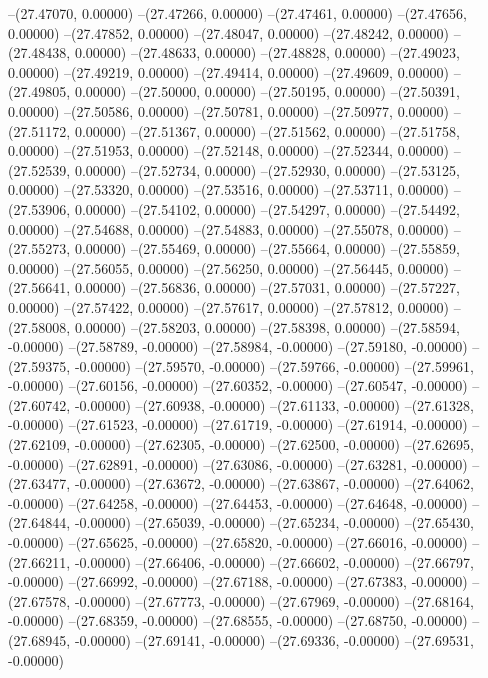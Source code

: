 --(27.47070, 0.00000)
--(27.47266, 0.00000)
--(27.47461, 0.00000)
--(27.47656, 0.00000)
--(27.47852, 0.00000)
--(27.48047, 0.00000)
--(27.48242, 0.00000)
--(27.48438, 0.00000)
--(27.48633, 0.00000)
--(27.48828, 0.00000)
--(27.49023, 0.00000)
--(27.49219, 0.00000)
--(27.49414, 0.00000)
--(27.49609, 0.00000)
--(27.49805, 0.00000)
--(27.50000, 0.00000)
--(27.50195, 0.00000)
--(27.50391, 0.00000)
--(27.50586, 0.00000)
--(27.50781, 0.00000)
--(27.50977, 0.00000)
--(27.51172, 0.00000)
--(27.51367, 0.00000)
--(27.51562, 0.00000)
--(27.51758, 0.00000)
--(27.51953, 0.00000)
--(27.52148, 0.00000)
--(27.52344, 0.00000)
--(27.52539, 0.00000)
--(27.52734, 0.00000)
--(27.52930, 0.00000)
--(27.53125, 0.00000)
--(27.53320, 0.00000)
--(27.53516, 0.00000)
--(27.53711, 0.00000)
--(27.53906, 0.00000)
--(27.54102, 0.00000)
--(27.54297, 0.00000)
--(27.54492, 0.00000)
--(27.54688, 0.00000)
--(27.54883, 0.00000)
--(27.55078, 0.00000)
--(27.55273, 0.00000)
--(27.55469, 0.00000)
--(27.55664, 0.00000)
--(27.55859, 0.00000)
--(27.56055, 0.00000)
--(27.56250, 0.00000)
--(27.56445, 0.00000)
--(27.56641, 0.00000)
--(27.56836, 0.00000)
--(27.57031, 0.00000)
--(27.57227, 0.00000)
--(27.57422, 0.00000)
--(27.57617, 0.00000)
--(27.57812, 0.00000)
--(27.58008, 0.00000)
--(27.58203, 0.00000)
--(27.58398, 0.00000)
--(27.58594, -0.00000)
--(27.58789, -0.00000)
--(27.58984, -0.00000)
--(27.59180, -0.00000)
--(27.59375, -0.00000)
--(27.59570, -0.00000)
--(27.59766, -0.00000)
--(27.59961, -0.00000)
--(27.60156, -0.00000)
--(27.60352, -0.00000)
--(27.60547, -0.00000)
--(27.60742, -0.00000)
--(27.60938, -0.00000)
--(27.61133, -0.00000)
--(27.61328, -0.00000)
--(27.61523, -0.00000)
--(27.61719, -0.00000)
--(27.61914, -0.00000)
--(27.62109, -0.00000)
--(27.62305, -0.00000)
--(27.62500, -0.00000)
--(27.62695, -0.00000)
--(27.62891, -0.00000)
--(27.63086, -0.00000)
--(27.63281, -0.00000)
--(27.63477, -0.00000)
--(27.63672, -0.00000)
--(27.63867, -0.00000)
--(27.64062, -0.00000)
--(27.64258, -0.00000)
--(27.64453, -0.00000)
--(27.64648, -0.00000)
--(27.64844, -0.00000)
--(27.65039, -0.00000)
--(27.65234, -0.00000)
--(27.65430, -0.00000)
--(27.65625, -0.00000)
--(27.65820, -0.00000)
--(27.66016, -0.00000)
--(27.66211, -0.00000)
--(27.66406, -0.00000)
--(27.66602, -0.00000)
--(27.66797, -0.00000)
--(27.66992, -0.00000)
--(27.67188, -0.00000)
--(27.67383, -0.00000)
--(27.67578, -0.00000)
--(27.67773, -0.00000)
--(27.67969, -0.00000)
--(27.68164, -0.00000)
--(27.68359, -0.00000)
--(27.68555, -0.00000)
--(27.68750, -0.00000)
--(27.68945, -0.00000)
--(27.69141, -0.00000)
--(27.69336, -0.00000)
--(27.69531, -0.00000)
